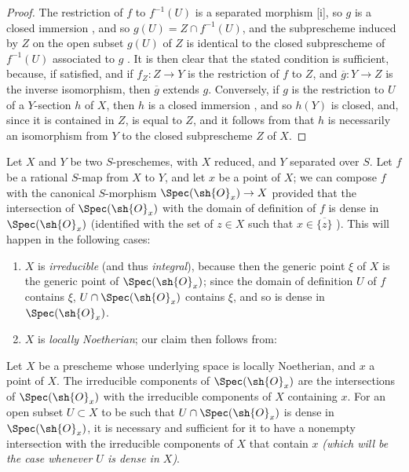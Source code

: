 \begin{proof}
The restriction of $f$ to $f^{-1}(U)$ is a separated morphism [i], so $g$ is a closed immersion , and so $g(U)=Z\cap f^{-1}(U)$, and the subprescheme induced by $Z$ on the open subset $g(U)$ of $Z$ is identical to the closed subprescheme of $f^{-1}(U)$ associated to $g$ .
It is then clear that the stated condition is sufficient, because, if satisfied, and if $f_Z:Z\to Y$ is the restriction of $f$ to $Z$, and $\overline{g}:Y\to Z$ is the inverse isomorphism, then $\overline{g}$ extends $g$.
Conversely, if $g$ is the restriction to $U$ of a $Y$-section $h$ of $X$, then $h$ is a closed immersion , and so $h(Y)$ is closed, and, since it is contained in $Z$, is equal to $Z$, and it follows from  that $h$ is necessarily an isomorphism from $Y$ to the closed subprescheme $Z$ of $X$.
\end{proof}

\begin{env}[7.2.8]
\label{I.7.2.8}
Let $X$ and $Y$ be two $S$-preschemes, with $X$ reduced, and $Y$ separated over $S$.
Let $f$ be a rational $S$-map from $X$ to $Y$, and let $x$ be a point of $X$; we can compose $f$ with the canonical $S$-morphism $\Spec(\sh{O}_x)\to X$  provided that the intersection of $\Spec(\sh{O}_x)$ with the domain of definition of $f$ is dense in $\Spec(\sh{O}_x)$ (identified with the set of $z\in X$ such that $x\in\overline{\{z\}}$ ).
This will happen in the following cases:
\begin{enumerate}
  \item[1st.] $X$ is \emph{irreducible} (and thus \emph{integral}), because then the generic point $\xi$ of $X$ is the generic point of $\Spec(\sh{O}_x)$; since the domain of definition $U$ of $f$ contains $\xi$, $U\cap\Spec(\sh{O}_x)$ contains $\xi$, and so is dense in $\Spec(\sh{O}_x)$.
  \item[2nd.] $X$ is \emph{locally Noetherian}; our claim then follows from:
\end{enumerate}
\end{env}

\begin{lemma}[7.2.8.1]
\label{I.7.2.8.1}
Let $X$ be a prescheme whose underlying space is locally Noetherian, and $x$ a point of $X$.
The irreducible components of $\Spec(\sh{O}_x)$ are the intersections of $\Spec(\sh{O}_x)$ with the irreducible components of $X$ containing $x$.
For an open subset $U\subset X$ to be such that $U\cap\Spec(\sh{O}_x)$ is dense in $\Spec(\sh{O}_x)$, it is necessary and sufficient for it to have a nonempty intersection with the irreducible components of $X$ that contain $x$ \emph{(which will be the case whenever $U$ is \emph{dense} in $X$)}.
\end{lemma}

